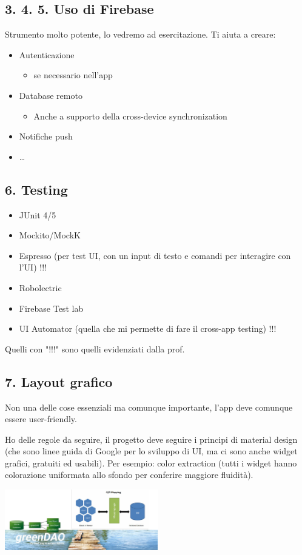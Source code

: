 \subsection{3. 4. 5. Uso di Firebase}
\par Strumento molto potente, lo vedremo ad esercitazione. Ti aiuta a creare:
\begin{itemize}
    \item Autenticazione
    \begin{itemize}
        \item se necessario nell'app
    \end{itemize}
    \item Database remoto
    \begin{itemize}
        \item Anche a supporto della cross-device synchronization
    \end{itemize}
    \item Notifiche push
    \item \dots
\end{itemize}

\subsection{6. Testing}
\begin{itemize}
    \item JUnit 4/5
    \item Mockito/MockK
    \item Espresso (per test UI, con un input di testo e comandi per interagire con l'UI) !!!
    \item Robolectric
    \item Firebase Test lab
    \item UI Automator (quella che mi permette di fare il cross-app testing) !!!
\end{itemize}
Quelli con "!!!" sono quelli evidenziati dalla prof.

\subsection{7. Layout grafico}
\par Non una delle cose essenziali ma comunque importante, l'app deve comunque essere user-friendly.
\par Ho delle regole da seguire, il progetto deve seguire i principi di material design (che sono linee guida di Google per lo sviluppo di UI, ma ci sono anche widget grafici, gratuiti ed usabili). Per esempio: color extraction (tutti i widget hanno colorazione uniformata allo sfondo per conferire maggiore fluidità).
\begin{center}
    \includegraphics[width=0.5\textwidth]{images/00_orm1.png}
\end{center}


